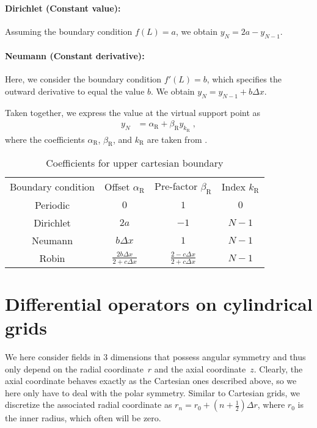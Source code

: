 \documentclass[
	superscriptaddress,
	twocolumn,
	aps, pre
]{revtex4-1}
\newcommand{\dx}{\Delta x}
\newcommand{\dr}{\Delta r}
\newcommand{\R}{_\mathrm{R}}
\begin{document}
\paragraph{Dirichlet (Constant value):}
Assuming the boundary condition $f(L) = a$, we obtain $y_N = 2a - y_{N-1}$.

\paragraph{Neumann (Constant derivative):}
Here, we consider the boundary condition $f'(L) = b$, which specifies the outward derivative to equal the value $b$.
We obtain $y_N = y_{N-1} + b \dx$.


Taken together, we express the value at the virtual support point as
\begin{align}
	y_N &= \alpha\R + \beta\R y_{k\R}
	\;,
\end{align}
where the coefficients $\alpha\R$, $\beta\R$, and $k\R$ are taken from .


\begin{table}[t]
\caption{\label{tab:cartesian_upper}%
Coefficients for upper cartesian boundary
}
\begin{ruledtabular}
	\begin{tabular}{cccc}
		Boundary condition & Offset $\alpha\R$ & Pre-factor $\beta\R$  & Index $k\R$\\
		\colrule
		Periodic & $0$ & $1$ & $0$ \\
		Dirichlet & $2a$ & $-1$ & $N-1$ \\
		Neumann & $b\dx$ & $1$  & $N-1$ \\
		Robin & $\frac{2b\dx}{2 + c \dx}$ &
				$\frac{2 - c\dx}{2 + c \dx}$ & $N-1$ \\
	\end{tabular}
\end{ruledtabular}
\end{table}


\section{Differential operators on cylindrical grids}
We here consider fields in $3$ dimensions that possess angular symmetry and thus only depend on the radial coordinate~$r$ and the axial coordinate~$z$.
Clearly, the axial coordinate behaves exactly as the Cartesian ones described above, so we here only have to deal with the polar symmetry.
Similar to Cartesian grids, we discretize the associated radial coordinate as $r_n = r_0 + (n + \frac12) \dr$, where $r_0$ is the inner radius, which often will be zero.
\end{document}
